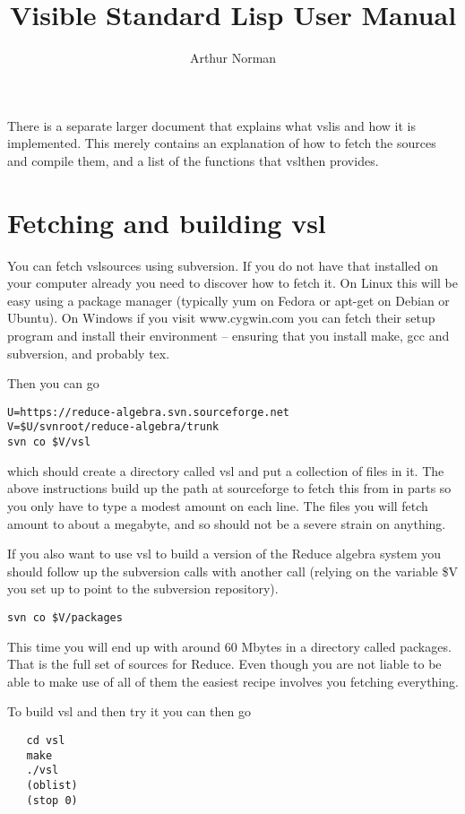 \documentclass[a4paper,12pt]{article}
\title{Visible Standard Lisp User Manual}
\author{Arthur Norman}
\newcommand{\vsl}{{\ttfamily vsl}}
\newcommand{\tx}{\ttfamily}
\begin{document}
\maketitle


There is a separate larger document that explains what \vsl is
and how it is implemented. This merely contains an explanation of how
to fetch the sources and compile them, and a list of the functions
that \vsl then provides.


\section{Fetching and building vsl}
You can fetch \vsl sources using {\tx subversion}. If you do not have that
installed on your computer already you need to discover how to fetch it.
On Linux this will be easy using a package manager (typically {\tx yum}
on Fedora or {\tx apt-get} on Debian or Ubuntu). On Windows if you visit
{\tx www.cygwin.com} you can fetch their setup program and install their
environment -- ensuring that you install {\tx make}, {\tx gcc} and
{\tx subversion}, and probably {\tx tex}.

Then you can go
{\small\begin{verbatim}
U=https://reduce-algebra.svn.sourceforge.net
V=$U/svnroot/reduce-algebra/trunk
svn co $V/vsl
\end{verbatim}}
which should create a directory called {\tx vsl} and put a collection of
files in it. The above instructions build up the path at {\tx sourceforge}
to fetch this from in parts so you only have to type a modest
amount on each line. The files you will fetch amount to about a megabyte,
and so should not be a severe strain on anything.

If you also want to use \vsl{} to build a version of the Reduce algebra
system you should follow up the subversion calls with another call (relying
on the variable {\tx \$V} you set up to point to the subversion repository).
{\small\begin{verbatim}
svn co $V/packages
\end{verbatim}}
This time you will end up with around 60 Mbytes in a directory called
{\tx packages}. That is the full set of sources for Reduce. Even though you
are not liable to be able to make use of all of them the easiest recipe
involves you fetching everything.

To build \vsl{} and then try it you can then go
{\small\begin{verbatim}
   cd vsl
   make
   ./vsl
   (oblist)
   (stop 0)
\end{verbatim}}
\end{document}
